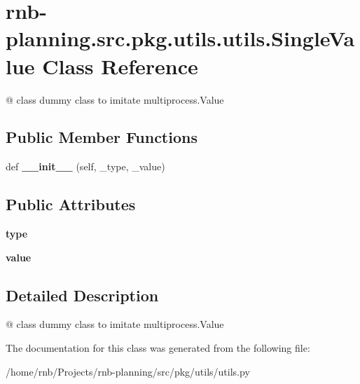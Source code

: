 \hypertarget{classrnb-planning_1_1src_1_1pkg_1_1utils_1_1utils_1_1_single_value}{}\section{rnb-\/planning.src.\+pkg.\+utils.\+utils.\+Single\+Value Class Reference}
\label{classrnb-planning_1_1src_1_1pkg_1_1utils_1_1utils_1_1_single_value}


@ class dummy class to imitate multiprocess.\+Value  


\subsection*{Public Member Functions}
\begin{DoxyCompactItemize}
\item 
\mbox{\label{classrnb-planning_1_1src_1_1pkg_1_1utils_1_1utils_1_1_single_value_aa3d7b9f36b724875a38de99ed4ef4b0d}} 
def {\bfseries \+\_\+\+\_\+init\+\_\+\+\_\+} (self, \+\_\+type, \+\_\+value)
\end{DoxyCompactItemize}
\subsection*{Public Attributes}
\begin{DoxyCompactItemize}
\item 
\mbox{\label{classrnb-planning_1_1src_1_1pkg_1_1utils_1_1utils_1_1_single_value_a0803949fc0ae77b8fc65ed4434589849}} 
{\bfseries type}
\item 
\mbox{\label{classrnb-planning_1_1src_1_1pkg_1_1utils_1_1utils_1_1_single_value_a56b821bf17cc08afd7e5cb206890cff6}} 
{\bfseries value}
\end{DoxyCompactItemize}


\subsection{Detailed Description}
@ class dummy class to imitate multiprocess.\+Value 

The documentation for this class was generated from the following file\+:\begin{DoxyCompactItemize}
\item 
/home/rnb/\+Projects/rnb-\/planning/src/pkg/utils/utils.\+py\end{DoxyCompactItemize}
